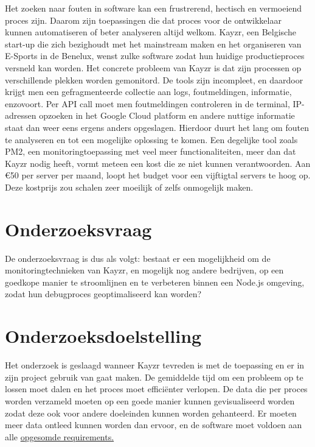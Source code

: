 Het zoeken naar fouten in software kan een frustrerend, hectisch en vermoeiend proces zijn. Daarom zijn toepassingen die dat proces voor de ontwikkelaar kunnen automatiseren of beter analyseren altijd welkom. Kayzr, een Belgische start-up die zich bezighoudt met het mainstream maken en het organiseren van E-Sports in de Benelux, wenst zulke software zodat hun huidige productieproces versneld kan worden. 
Het concrete probleem van Kayzr is dat zijn processen op verschillende plekken worden gemonitord. De tools zijn incompleet, en daardoor krijgt men een gefragmenteerde collectie aan logs, foutmeldingen, informatie, enzovoort.  Per API call moet men foutmeldingen controleren in de terminal, IP-adressen opzoeken in het Google Cloud platform en andere nuttige informatie staat dan weer eens ergens anders opgeslagen. Hierdoor duurt het lang om fouten te analyseren en tot een mogelijke oplossing te komen. Een degelijke tool zoals PM2, een monitoringtoepassing met veel meer functionaliteiten, meer dan dat Kayzr nodig heeft, vormt meteen een kost die ze niet kunnen verantwoorden. Aan \euro 50 per server per maand, loopt het budget voor een vijftigtal servers te hoog op. Deze kostprijs zou schalen zeer moeilijk of zelfs onmogelijk maken.

\section{Onderzoeksvraag}
\label{sec:onderzoeksvraag}

De onderzoeksvraag is dus als volgt: bestaat er een mogelijkheid om de monitoringtechnieken van Kayzr, en mogelijk nog andere bedrijven, op een goedkope manier te stroomlijnen en te verbeteren binnen een Node.js omgeving, zodat hun debugproces geoptimaliseerd kan worden? 


\section{Onderzoeksdoelstelling}
\label{sec:onderzoeksdoelstelling}

Het onderzoek is geslaagd wanneer Kayzr tevreden is met de toepassing en er in zijn project gebruik van gaat maken. De gemiddelde tijd om een probleem op te lossen moet dalen en het proces moet efficiënter verlopen. De data die per proces worden verzameld moeten op een goede manier kunnen gevisualiseerd worden zodat deze ook voor andere doeleinden kunnen worden gehanteerd. Er moeten meer data ontleed kunnen worden dan ervoor, en de software moet voldoen aan alle \hyperref[sec:requirements]{opgesomde requirements.}


